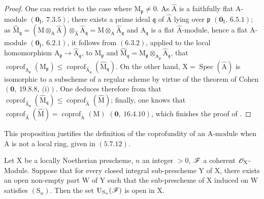\begin{proof}
One can restrict to the case where $\mathrm{M}_\mathfrak{p}\neq 0$. As $\widehat{\mathrm{A}}$ is a faithfully flat $\mathrm{A}$-module
$(\mathbf{0}_\mathrm{I},~7.3.5)$, there exists a prime ideal $\mathfrak{q}$ of $\widehat{\mathrm{A}}$ lying over $\mathfrak{p}$ $(\mathbf{0}_\mathrm{I},~6.5.1)$; as
$\widehat{\mathrm{M}}_\mathfrak{q}=(\mathrm{M}\otimes_\mathrm{A}\widehat{\mathrm{A}})\otimes_{\widehat{\mathrm{A}}}\widehat{\mathrm{A}}_\mathfrak{q}=\mathrm{M}\otimes_\mathrm{A}\widehat{\mathrm{A}}_\mathfrak{q}$ and $\widehat{\mathrm{A}}_\mathfrak{q}$ is a flat $\widehat{\mathrm{A}}$-module, hence a flat
$\mathrm{A}$-module
$(\mathbf{0}_\mathrm{I},~6.2.1)$, it follows from $(6.3.2)$, applied to the local homomorphism $\mathrm{A}_\mathfrak{p}\to\widehat{\mathrm{A}}_\mathfrak{q}$, to $\mathrm{M}_\mathfrak{p}$
and $\widehat{\mathrm{M}}_\mathfrak{q}=\mathrm{M}_\mathfrak{p}\otimes_{\mathrm{A}_\mathfrak{p}}\widehat{\mathrm{A}}_\mathfrak{q}$, that $\operatorname{coprof}_{\mathrm{A}_\mathfrak{p}}(\mathrm{M}_\mathfrak{p})\leqslant\operatorname{coprof}_{\widehat{\mathrm{A}}_\mathfrak{q}}(\widehat{\mathrm{M}}_\mathfrak{q})$. On the other hand, $\mathrm{X}=\operatorname{Spec}(\widehat{\mathrm{A}})$
is isomorphic to a subscheme of a regular scheme by virtue of the theorem of Cohen
$(\mathbf{0},~19.8.8,~\text{(i)})$. One deduces therefore from  that $\operatorname{coprof}_{\widehat{\mathrm{A}}_\mathfrak{q}}(\widehat{\mathrm{M}}_\mathfrak{q})\leqslant\operatorname{coprof}_{\widehat{\mathrm{A}}}(\widehat{\mathrm{M}})$; finally,
one knows that $\operatorname{coprof}_{\widehat{\mathrm{A}}}(\widehat{\mathrm{M}})=\operatorname{coprof}_\mathrm{A}(\mathrm{M})$ $(\mathbf{0},~16.4.10)$, which finishes the proof of .
\end{proof}

This proposition justifies the definition of the coprofundity of an $\mathrm{A}$-module when $\mathrm{A}$
is not a local ring, given in $(5.7.12)$.

\begin{proposition}[6.11.6]
\label{IV.6.11.6}
Let $\mathrm{X}$ be a locally Noetherian prescheme, $n$ an integer $>0$, $\mathscr{F}$ a coherent $\mathscr{O}_\mathrm{X}$-Module.
Suppose that for every closed integral sub-prescheme $\mathrm{Y}$ of $\mathrm{X}$, there exists
an open non-empty part $\mathrm{W}$ of $\mathrm{Y}$ such that the sub-prescheme of $\mathrm{X}$ induced on $\mathrm{W}$ satisfies $(\mathrm{S}_n)$.
Then the set $\mathrm{U}_{\mathrm{S}_n}(\mathscr{F})$ is open in $\mathrm{X}$.
\end{proposition}


